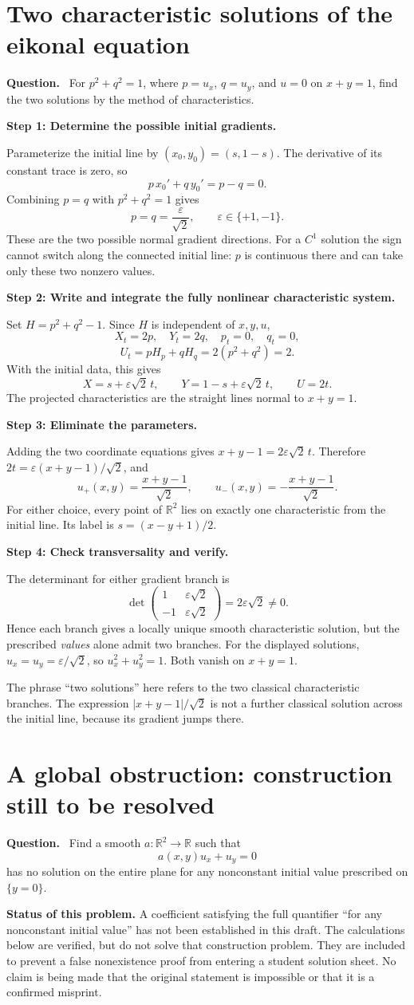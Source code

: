 \documentclass[11pt,a4paper]{article}
\newcommand{\R}{\mathbb R}
\newcommand{\step}[1]{\par\medskip\textbf{#1}\par}
\newenvironment{question}{\par\smallskip\begingroup\color{ink}\textbf{Question.}\ }{\par\endgroup\medskip}
\newcommand{\answer}[1]{\begin{equation*}\boxed{\displaystyle #1}\end{equation*}}
\newcommand{\problem}[1]{\clearpage\section{#1}}
\begin{document}
\problem{Two characteristic solutions of the eikonal equation}
\begin{question}
For $p^2+q^2=1$, where $p=u_x$, $q=u_y$, and $u=0$ on $x+y=1$, find the two solutions by the method of characteristics.
\end{question}
\step{Step 1: Determine the possible initial gradients.}
Parameterize the initial line by $(x_0,y_0)=(s,1-s)$. The derivative of its constant trace is zero, so
\[
 p\,x_0'+q\,y_0'=p-q=0.
\]
Combining $p=q$ with $p^2+q^2=1$ gives
\[
 p=q=\frac{\varepsilon}{\sqrt2},\qquad \varepsilon\in\{+1,-1\}.
\]
These are the two possible normal gradient directions. For a $C^1$ solution the sign cannot switch along the connected initial line: $p$ is continuous there and can take only these two nonzero values.

\step{Step 2: Write and integrate the fully nonlinear characteristic system.}
Set $H=p^2+q^2-1$. Since $H$ is independent of $x,y,u$,
\[
 X_t=2p,\quad Y_t=2q,\quad p_t=0,\quad q_t=0,
\]
\[
 U_t=pH_p+qH_q=2(p^2+q^2)=2.
\]
With the initial data, this gives
\[
 X=s+\varepsilon\sqrt2\,t,\qquad
 Y=1-s+\varepsilon\sqrt2\,t,\qquad U=2t.
\]
The projected characteristics are the straight lines normal to $x+y=1$.

\step{Step 3: Eliminate the parameters.}
Adding the two coordinate equations gives $x+y-1=2\varepsilon\sqrt2\,t$. Therefore $2t=\varepsilon(x+y-1)/\sqrt2$, and
\answer{u_+(x,y)=\frac{x+y-1}{\sqrt2},\qquad
 u_-(x,y)=-\frac{x+y-1}{\sqrt2}.}
For either choice, every point of $\R^2$ lies on exactly one characteristic from the initial line. Its label is $s=(x-y+1)/2$.

\step{Step 4: Check transversality and verify.}
The determinant for either gradient branch is
\[
 \det\begin{pmatrix}1&\varepsilon\sqrt2\\-1&\varepsilon\sqrt2\end{pmatrix}
 =2\varepsilon\sqrt2\ne0.
\]
Hence each branch gives a locally unique smooth characteristic solution, but the prescribed \emph{values} alone admit two branches. For the displayed solutions, $u_x=u_y=\varepsilon/\sqrt2$, so $u_x^2+u_y^2=1$. Both vanish on $x+y=1$.

The phrase ``two solutions'' here refers to the two classical characteristic branches. The expression $|x+y-1|/\sqrt2$ is not a further classical solution across the initial line, because its gradient jumps there.

\problem{A global obstruction: construction still to be resolved}
\begin{question}
Find a smooth $a:\R^2\to\R$ such that
\[
 a(x,y)u_x+u_y=0
\]
has no solution on the entire plane for any nonconstant initial value prescribed on $\{y=0\}$.
\end{question}
\textbf{Status of this problem.} A coefficient satisfying the full quantifier ``for any nonconstant initial value'' has not been established in this draft. The calculations below are verified, but do not solve that construction problem. They are included to prevent a false nonexistence proof from entering a student solution sheet. No claim is being made that the original statement is impossible or that it is a confirmed misprint.
\end{document}
